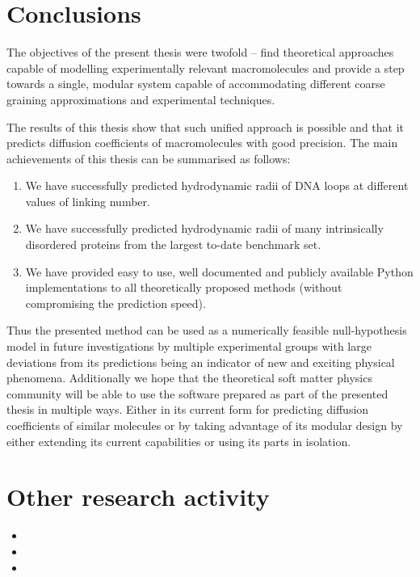 \documentclass{doctoral}
\begin{document}
\chapter{Conclusions}

The objectives of the present thesis were twofold -- find theoretical approaches capable of modelling experimentally relevant macromolecules and provide a step towards a single, modular system capable of accommodating different coarse graining approximations and experimental techniques.

The results of this thesis show that such unified approach is possible and that it predicts diffusion coefficients of macromolecules with good precision.
The main achievements of this thesis can be summarised as follows:
\begin{enumerate}
    \item We have successfully predicted hydrodynamic radii of DNA loops at different values of linking number.
    \item We have successfully predicted hydrodynamic radii of many intrinsically disordered proteins from the largest to-date benchmark set.
    \item We have provided easy to use, well documented and publicly available Python implementations to all theoretically proposed methods (without compromising the prediction speed).
\end{enumerate}

Thus the presented method can be used as a numerically feasible null-hypothesis model in future investigations by multiple experimental groups with large deviations from its predictions being an indicator of new and exciting physical phenomena.
Additionally we hope that the theoretical soft matter physics community will be able to use the software prepared as part of the presented thesis in multiple ways.
Either in its current form for predicting diffusion coefficients of similar molecules or by taking advantage of its modular design by either extending its current capabilities or using its parts in isolation.

\appendix

\chapter{Other research activity}
\begin{itemize}
    \item {}
    \item {}
    \item {}
\end{itemize}

\printbibliography[heading=bibchapter]
\end{document}
